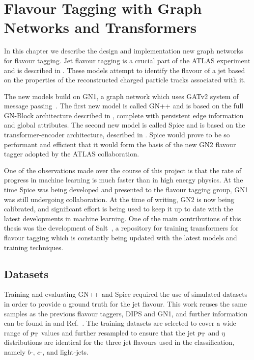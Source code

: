 
\chapter{Flavour Tagging with Graph Networks and Transformers}
\label{ch:spice}

In this chapter we describe the design and implementation new graph networks for flavour tagging.
Jet flavour tagging is a crucial part of the ATLAS experiment and is described in .
These models attempt to identify the flavour of a jet based on the properties of the reconstructed charged particle tracks associated with it.

The new models build on GN1, a graph network which uses GATv2 system of message passing~\cite{GATv2}.
The first new model is called GN++ and is based on the full GN-Block architecture described in , complete with persistent edge information and global attributes.
The second new model is called Spice and is based on the transformer-encoder architecture, described in .
Spice would prove to be so performant and efficient that it would form the basis of the new GN2 flavour tagger adopted by the ATLAS collaboration.

One of the observations made over the course of this project is that the rate of progress in machine learning is much faster than in high energy physics.
At the time Spice was being developed and presented to the flavour tagging group, GN1 was still undergoing collaboration.
At the time of writing, GN2 is now being calibrated, and significant effort is being used to keep it up to date with the latest developments in machine learning.
One of the main contributions of this thesis was the development of Salt~\cite{Salt}, a repository for training transformers for flavour tagging which is constantly being updated with the latest models and training techniques.

\section{Datasets}

Training and evaluating GN++ and Spice required the use of simulated datasets in order to provide a ground truth for the jet flavour.
This work reuses the same samples as the previous flavour taggers, DIPS and GN1, and further information can be found in \textcite{AlexThesis} and Ref.~\cite{GN1}.
The training datasets are selected to cover a wide range of $p_{\text{T}}$ values and further resampled to ensure that the jet $p_{\text{T}}$ and $\eta$ distributions are identical for the three jet flavours used in the classification, namely $b$-, $c$-, and light-jets.

